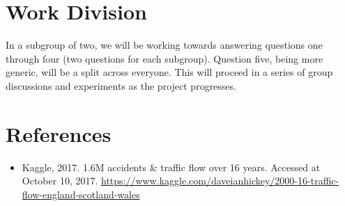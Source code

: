 \documentclass[a4paper, 11pt]{article}
\begin{document}
     \section{Work Division}
     In a subgroup of two, we will be working towards answering questions one through four (two questions for each subgroup). Question five, being more generic, will
     be a split across everyone. This will proceed in a series of group discussions and experiments as the project progresses.
     

     \section{References}
     \begin{itemize}
       \item Kaggle, 2017. 1.6M accidents \& traffic flow over 16 years. Accessed at October 10, 2017. \url{https://www.kaggle.com/daveianhickey/2000-16-traffic-flow-england-scotland-wales}
     \end{itemize}
\end{document}

